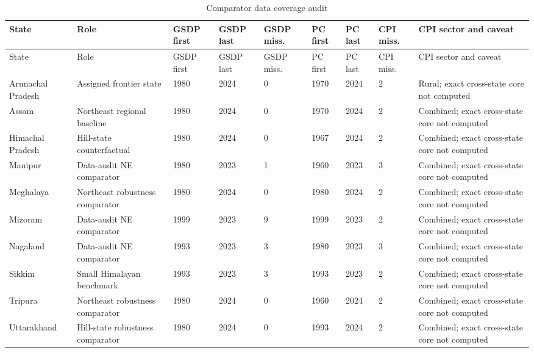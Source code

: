 \documentclass[11pt,a4paper]{article}
\begin{document}
\begin{landscape}
\scriptsize
\setlength{\tabcolsep}{3pt}
\begin{longtable}{L{2.8cm}L{3.2cm}C{1.15cm}C{1.15cm}C{1.15cm}C{1.15cm}C{1.15cm}C{1.15cm}L{3.6cm}}
\caption{Comparator data coverage audit}
\label{tab:coverage-audit}\\
\toprule
State & Role & GSDP first & GSDP last & GSDP miss. & PC first & PC last & CPI miss. & CPI sector and caveat \\
\midrule
\endfirsthead
\toprule
State & Role & GSDP first & GSDP last & GSDP miss. & PC first & PC last & CPI miss. & CPI sector and caveat \\
\midrule
\endhead
Arunachal Pradesh & Assigned frontier state & 1980 & 2024 & 0 & 1970 & 2024 & 2 & Rural; exact cross-state core not computed \\
Assam & Northeast regional baseline & 1980 & 2024 & 0 & 1970 & 2024 & 2 & Combined; exact cross-state core not computed \\
Himachal Pradesh & Hill-state counterfactual & 1980 & 2024 & 0 & 1967 & 2024 & 2 & Combined; exact cross-state core not computed \\
Manipur & Data-audit NE comparator & 1980 & 2023 & 1 & 1960 & 2023 & 3 & Combined; exact cross-state core not computed \\
Meghalaya & Northeast robustness comparator & 1980 & 2024 & 0 & 1980 & 2024 & 2 & Combined; exact cross-state core not computed \\
Mizoram & Data-audit NE comparator & 1999 & 2023 & 9 & 1999 & 2023 & 2 & Combined; exact cross-state core not computed \\
Nagaland & Data-audit NE comparator & 1993 & 2023 & 3 & 1980 & 2023 & 3 & Combined; exact cross-state core not computed \\
Sikkim & Small Himalayan benchmark & 1993 & 2023 & 3 & 1993 & 2023 & 2 & Combined; exact cross-state core not computed \\
Tripura & Northeast robustness comparator & 1980 & 2024 & 0 & 1960 & 2024 & 2 & Combined; exact cross-state core not computed \\
Uttarakhand & Hill-state robustness comparator & 1980 & 2024 & 0 & 1993 & 2024 & 2 & Combined; exact cross-state core not computed \\
\bottomrule
\end{longtable}
\setlength{\tabcolsep}{6pt}
\end{landscape}
\end{document}

